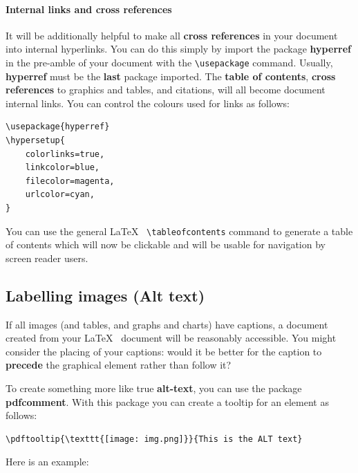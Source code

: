 \documentclass[]{article}
\begin{document}
\hypertarget{internal-links-and-cross-references}{%
\paragraph{Internal links and cross
references}\label{internal-links-and-cross-references}}

It will be additionally helpful to make all \textbf{cross references} in
your document into internal hyperlinks. You can do this simply by import
the package \textbf{hyperref} in the pre-amble of your document with the
\texttt{\textbackslash{}usepackage} command. Usually, \textbf{hyperref}
must be the \textbf{last} package imported. The \textbf{table of
contents}, \textbf{cross references} to graphics and tables, and
citations, will all become document internal links. You can control the
colours used for links as follows:

\begin{verbatim}
\usepackage{hyperref}
\hypersetup{
    colorlinks=true,
    linkcolor=blue,
    filecolor=magenta,
    urlcolor=cyan,
}
\end{verbatim}

You can use the general \LaTeX~ \texttt{\textbackslash{}tableofcontents}
command to generate a table of contents which will now be clickable and
will be usable for navigation by screen reader users.

\hypertarget{labelling-images-alt-text}{%
\subsection{Labelling images (Alt
text)}\label{labelling-images-alt-text}}

If all images (and tables, and graphs and charts) have captions, a
document created from your \LaTeX~ document will be reasonably
accessible. You might consider the placing of your captions: would it be
better for the caption to \textbf{precede} the graphical element rather
than follow it?

To create something more like true \textbf{alt-text}, you can use the
package \textbf{pdfcomment}. With this package you can create a tooltip
for an element as follows:

\begin{verbatim}
\pdftooltip{\texttt{[image: img.png]}}{This is the ALT text}
\end{verbatim}

Here is an example:

\end{document}
